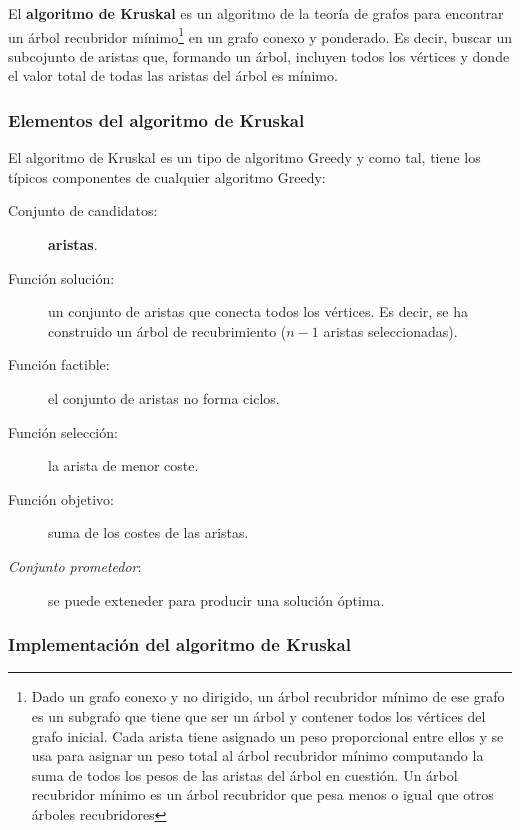 \documentclass[10pt,a4paper,spanish]{report}
\theoremstyle{definition}
\theoremstyle{remark}
\begin{document}
El \textbf{\textcolor{electriccrimson}{algoritmo de Kruskal}} es un algoritmo de la teoría de grafos para encontrar un árbol recubridor mínimo\footnote{Dado un grafo conexo y no dirigido, un árbol recubridor mínimo de ese grafo es un subgrafo que tiene que ser un árbol y contener todos los vértices del grafo inicial. Cada arista tiene asignado un peso proporcional entre ellos y se usa para asignar un peso total al árbol recubridor mínimo computando la suma de todos los pesos de las aristas del árbol en cuestión. Un árbol recubridor mínimo es un árbol recubridor que pesa menos o igual que otros árboles recubridores} en un grafo conexo y ponderado. Es decir, buscar un subcojunto de aristas que, formando un árbol, incluyen todos los vértices y donde el valor total de todas las aristas del árbol es mínimo.

\subsubsection{\textcolor{electriccrimson}Elementos del algoritmo de Kruskal}

El algoritmo de Kruskal es un tipo de algoritmo Greedy y como tal, tiene los típicos componentes de cualquier algoritmo Greedy:

\begin{description}
    \item [Conjunto de candidatos:] \textbf{\textcolor{electriccrimson}{aristas}}.
    \item [Función solución:] un conjunto de aristas que conecta todos los vértices. Es decir, se ha construido un árbol de recubrimiento ($n-1$ aristas seleccionadas). 
    \item [Función factible:] el conjunto de aristas no forma ciclos.
    \item [Función selección:] la arista de menor coste.
    \item [Función objetivo:] suma de los costes de las aristas.
    \item [\textit{Conjunto prometedor}:] se puede exteneder para producir una solución óptima.
\end{description}

\subsubsection{\textcolor{electriccrimson}Implementación del algoritmo de Kruskal}
\end{document}
